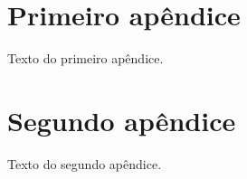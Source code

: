 \documentclass[article,12pt,oneside,a4paper,chapter=TITLE,english,brazil]{abntex2}
\begin{document}



%


% 

\newpage
\begin{apendicesenv}

\chapter{Primeiro apêndice}

Texto do primeiro apêndice.
\vspace{\onelineskip}


\chapter{Segundo apêndice}

Texto do segundo apêndice.

\end{apendicesenv}


% 
\end{document}
